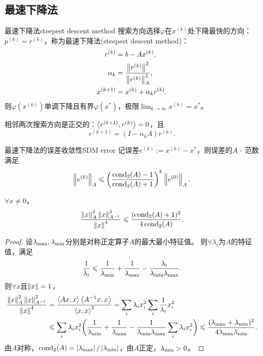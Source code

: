 \subsection{最速下降法}
\label{ssec:steepest descent method}

\begin{theorem}
    {最速下降法}{steepest descent method}
    搜索方向选择$\varphi$在$x^{(k)}$处下降最快的方向：$p^{(k)}=r^{(k)}$，称为最速下降法(steepest descent method)：
    \begin{subequations}
        \begin{align}
            r^{(k)}&=b-Ax^{(k)},\\
            \alpha_k&=\frac{\left\lVert r^{(k)}\right\rVert^2}{\left\lVert r^{(k)}\right\rVert_A^2},\\
            x^{(k+1)}&=x^{(k)}+\alpha_kr^{(k)}.
        \end{align}
    \end{subequations}
    则$\varphi(x^{(k)})$单调下降且有界$\varphi(x^*)$，极限$\lim_{k\to\infty}x^{(k)}=x^*$。
\end{theorem}

\begin{corollary}
    相邻两次搜索方向是正交的：$\left\langle r^{(k+1)},r^{(k)}\right\rangle=0$，且
    \[
        r^{(k+1)}=(I-\alpha_k A)r^{(k)}.
    \]
\end{corollary}

\begin{theorem}
    {最速下降法的误差收敛性}{SDM error}
    记误差$e^{(k)}:=x^{(k)}-x^*$，则误差的$A$ - 范数满足
    \begin{equation}
        \label{eqn:SDM e^k}
        \left\lVert e^{(k)}\right\rVert_A\leqslant\biggl(\frac{\operatorname{cond}_2(A)-1}{\operatorname{cond}_2(A)+1}\biggr)^k\left\lVert e^{(0)}\right\rVert_A.
    \end{equation}
\end{theorem}

\begin{lemma}
    $\forall x\neq 0$，
    \begin{equation}
        \frac{\left\lVert x\right\rVert_A^2\left\lVert x\right\rVert_{A^{-1}}^2}{\left\lVert x\right\rVert^4}\leqslant\frac{(\operatorname{cond}_2(A)+1)^2}{4\operatorname{cond}_2(A)}.
    \end{equation}
\end{lemma}

\begin{proof}
    设$\lambda_\mathrm{max},\lambda_\mathrm{min}$分别是对称正定算子$A$的最大最小特征值。
    则$\forall\lambda_i$为$A$的特征值，满足
    \[
        \frac1{\lambda_i}\leqslant\frac1{\lambda_\mathrm{min}}+\frac1{\lambda_\mathrm{max}}-\frac{\lambda_i}{\lambda_\mathrm{min}\lambda_\mathrm{max}}.
    \]
    则$\forall x$且$\left\lVert x\right\rVert=1$，
    \begin{align*}
        \frac{\left\lVert x\right\rVert_A^2\left\lVert x\right\rVert_{A^{-1}}^2}{\left\lVert x\right\rVert^4}&=\frac{\left\langle Ax,x\right\rangle\left\langle A^{-1} x,x\right\rangle}{\left\langle x,x\right\rangle^2}=\sum_i\lambda_ix_i^2\sum_i\frac1{\lambda_i}x_i^2\\
        &\leqslant\sum_i\lambda_ix_i^2\biggl(\frac1{\lambda_\mathrm{min}}+\frac1{\lambda_\mathrm{max}}-\frac1{\lambda_\mathrm{min}\lambda_\mathrm{max}}\sum_i\lambda_ix_i^2\biggr)\leqslant\frac{(\lambda_\mathrm{max}+\lambda_\mathrm{min})^2}{4\lambda_\mathrm{max}\lambda_\mathrm{min}}.
    \end{align*}
    由$A$对称，$\operatorname{cond}_2(A)=\left\lvert\lambda_\mathrm{max}\right\rvert/\left\lvert\lambda_\mathrm{min}\right\rvert$，由$A$正定，$\lambda_\mathrm{min}>0$。
\end{proof}

